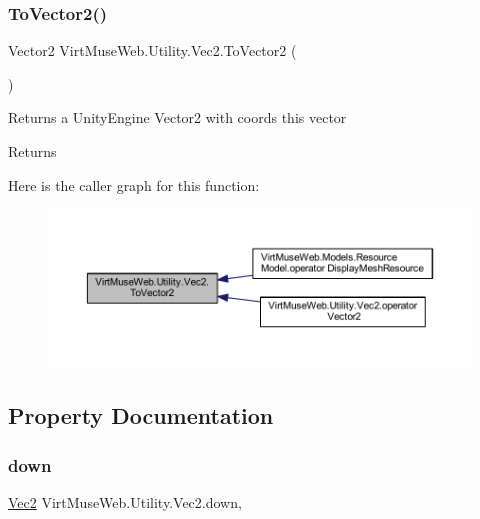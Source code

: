 \subsubsection{\texorpdfstring{To\+Vector2()}{ToVector2()}}
{\footnotesize\ttfamily Vector2 Virt\+Muse\+Web.\+Utility.\+Vec2.\+To\+Vector2 (\begin{DoxyParamCaption}{ }\end{DoxyParamCaption})}



Returns a Unity\+Engine Vector2 with coords this vector 

\begin{DoxyReturn}{Returns}

\end{DoxyReturn}
Here is the caller graph for this function\+:
\nopagebreak
\begin{figure}[H]
\begin{center}
\leavevmode
\includegraphics[width=350pt]{class_virt_muse_web_1_1_utility_1_1_vec2_adf9d148c0badd947b5655efbc24f560e_icgraph}
\end{center}
\end{figure}


\subsection{Property Documentation}
\mbox{\label{class_virt_muse_web_1_1_utility_1_1_vec2_ac876086c80c0440f9b3b2dceb5d0bdfc}} 
\subsubsection{\texorpdfstring{down}{down}}
{\footnotesize\ttfamily \mbox{\hyperlink{class_virt_muse_web_1_1_utility_1_1_vec2}{Vec2}} Virt\+Muse\+Web.\+Utility.\+Vec2.\+down\hspace{0.3cm}{\ttfamily [static]}, {\ttfamily [get]}}

